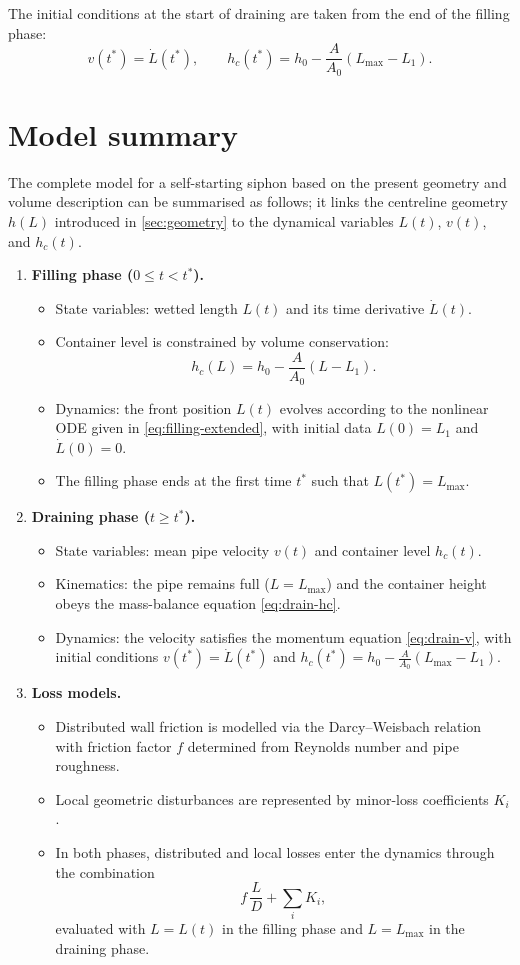 \documentclass[11pt]{article}
\begin{document}
The initial conditions at the start of draining are taken from the end of the filling phase:
\[
  v(t^*) = \dot L(t^*),\qquad
  h_c(t^*) = h_0 - \frac{A}{A_0}(L_{\max} - L_1).
\]

\section{Model summary}
\label{sec:summary}

The complete model for a self-starting siphon based on the present geometry and volume
description can be summarised as follows; it links the centreline geometry $h(L)$ introduced in \cref{sec:geometry} to the dynamical variables $L(t)$, $v(t)$, and $h_c(t)$.
\begin{enumerate}
  \item \textbf{Filling phase ($0 \le t < t^*$).}
    \begin{itemize}
      \item State variables: wetted length $L(t)$ and its time derivative $\dot L(t)$.
      \item Container level is constrained by volume conservation:
            \[
              h_c(L) = h_0 - \frac{A}{A_0}(L - L_1).
            \]
      \item Dynamics: the front position $L(t)$ evolves according to the nonlinear ODE
            given in \eqref{eq:filling-extended},
            with initial data $L(0) = L_1$ and $\dot L(0) = 0$.
      \item The filling phase ends at the first time $t^*$ such that $L(t^*) = L_{\max}$.
    \end{itemize}
  \item \textbf{Draining phase ($t \ge t^*$).}
    \begin{itemize}
      \item State variables: mean pipe velocity $v(t)$ and container level $h_c(t)$.
      \item Kinematics: the pipe remains full ($L = L_{\max}$) and the container height obeys
            the mass-balance equation \eqref{eq:drain-hc}.
      \item Dynamics: the velocity satisfies the momentum equation \eqref{eq:drain-v},
            with initial conditions
            $v(t^*) = \dot L(t^*)$ and
            $h_c(t^*) = h_0 - \frac{A}{A_0}(L_{\max} - L_1)$.
    \end{itemize}
  \item \textbf{Loss models.}
    \begin{itemize}
      \item Distributed wall friction is modelled via the Darcy--Weisbach relation with
            friction factor $f$ determined from Reynolds number and pipe roughness.
      \item Local geometric disturbances are represented by minor-loss coefficients $K_i$.
      \item In both phases, distributed and local losses enter the dynamics through the
            combination
            \[
              f\,\frac{L}{D} + \sum_i K_i,
            \]
            evaluated with $L = L(t)$ in the filling phase and $L = L_{\max}$ in the
            draining phase.
    \end{itemize}
\end{enumerate}
\end{document}

